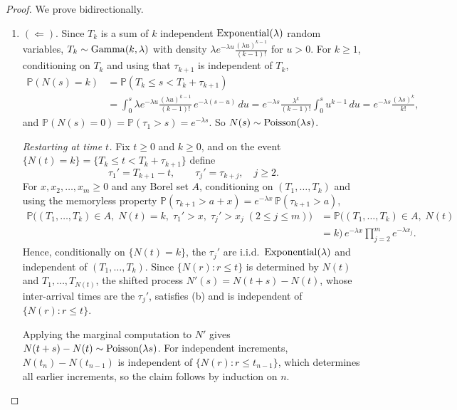 	\begin{proof}
		We prove bidirectionally. 
		\begin{enumerate}
		  \item $(\Leftarrow)$. Since $T_k$ is a sum of $k$ independent $\operatorname{Exponential}(\lambda)$ random variables, $T_k \sim \operatorname{Gamma}(k, \lambda)$ with density $\lambda e^{-\lambda u} \frac{(\lambda u)^{k-1}}{(k-1)!}$ for $u > 0$. For $k \geq 1$, conditioning on $T_k$ and using that $\tau_{k+1}$ is independent of $T_k$,
				\begin{align}
					\mathbb{P}(N(s) = k) & = \mathbb{P}(T_k \leq s < T_k + \tau_{k+1}) \\
					& = \int_0^s \lambda e^{-\lambda u} \frac{(\lambda u)^{k-1}}{(k-1)!} \, e^{-\lambda (s - u)} \, du
					= e^{-\lambda s} \frac{\lambda^k}{(k-1)!} \int_0^s u^{k-1} \, du
					= e^{-\lambda s} \frac{(\lambda s)^k}{k!},
				\end{align}
				and $\mathbb{P}(N(s) = 0) = \mathbb{P}(\tau_1 > s) = e^{-\lambda s}$. So $N(s) \sim \operatorname{Poisson}(\lambda s)$.

				\textit{Restarting at time $t$.} Fix $t \geq 0$ and $k \geq 0$, and on the event $\{N(t) = k\} = \{T_k \leq t < T_k + \tau_{k+1}\}$ define
				\begin{equation}
					\tau_1' = T_{k+1} - t, \qquad \tau_j' = \tau_{k+j}, \quad j \geq 2.
				\end{equation}
				For $x, x_2, \ldots, x_m \geq 0$ and any Borel set $A$, conditioning on $(T_1, \ldots, T_k)$ and using the memoryless property $\mathbb{P}(\tau_{k+1} > a + x) = e^{-\lambda x} \, \mathbb{P}(\tau_{k+1} > a)$,
				\begin{align}
					\mathbb{P}\big( (T_1, \ldots, T_k) \in A, \; N(t) = k, \; \tau_1' > x, \; \tau_j' > x_j \; (2 \leq j \leq m) \big)
						& = \mathbb{P}\big( (T_1, \ldots, T_k) \in A, \; N(t) \\ 
						& = k \big) \, e^{-\lambda x} \prod_{j=2}^m e^{-\lambda x_j}.
				\end{align}
				Hence, conditionally on $\{N(t) = k\}$, the $\tau_j'$ are i.i.d.\ $\operatorname{Exponential}(\lambda)$ and independent of $(T_1, \ldots, T_k)$. Since $\{N(r) : r \leq t\}$ is determined by $N(t)$ and $T_1, \ldots, T_{N(t)}$, the shifted process $N'(s) = N(t + s) - N(t)$, whose inter-arrival times are the $\tau_j'$, satisfies (b) and is independent of $\{N(r) : r \leq t\}$.

				Applying the marginal computation to $N'$ gives $N(t + s) - N(t) \sim \operatorname{Poisson}(\lambda s)$. For independent increments, $N(t_n) - N(t_{n-1})$ is independent of $\{N(r) : r \leq t_{n-1}\}$, which determines all earlier increments, so the claim follows by induction on $n$.


\end{enumerate}
\end{proof}
